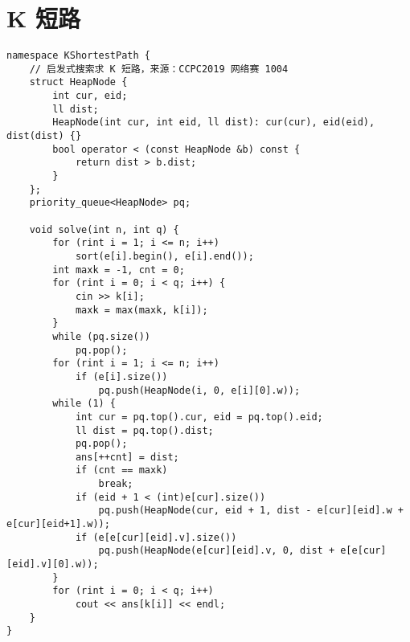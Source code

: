 \section{K 短路}

\begin{verbatim}
namespace KShortestPath {
    // 启发式搜索求 K 短路，来源：CCPC2019 网络赛 1004
    struct HeapNode {
        int cur, eid;
        ll dist;
        HeapNode(int cur, int eid, ll dist): cur(cur), eid(eid), dist(dist) {}
        bool operator < (const HeapNode &b) const {
            return dist > b.dist;
        }
    };
    priority_queue<HeapNode> pq;

    void solve(int n, int q) {
        for (rint i = 1; i <= n; i++)
            sort(e[i].begin(), e[i].end());
        int maxk = -1, cnt = 0;
        for (rint i = 0; i < q; i++) {
            cin >> k[i];
            maxk = max(maxk, k[i]);
        }
        while (pq.size())
            pq.pop();
        for (rint i = 1; i <= n; i++)
            if (e[i].size())
                pq.push(HeapNode(i, 0, e[i][0].w));
        while (1) {
            int cur = pq.top().cur, eid = pq.top().eid;
            ll dist = pq.top().dist;
            pq.pop();
            ans[++cnt] = dist;
            if (cnt == maxk)
                break;
            if (eid + 1 < (int)e[cur].size())
                pq.push(HeapNode(cur, eid + 1, dist - e[cur][eid].w + e[cur][eid+1].w));
            if (e[e[cur][eid].v].size())
                pq.push(HeapNode(e[cur][eid].v, 0, dist + e[e[cur][eid].v][0].w));
        }
        for (rint i = 0; i < q; i++)
            cout << ans[k[i]] << endl;
    }
}
\end{verbatim}